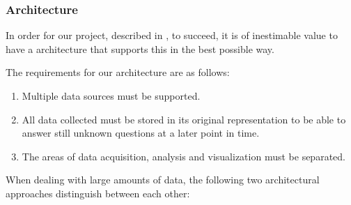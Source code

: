 \subsubsection{Architecture}
\label{subsubsec:architecture}
In order for our project, described in , to succeed, it is of inestimable value to have a
architecture that supports this in the best possible way.

The requirements for our architecture are as follows:
\begin{enumerate}
  \item Multiple data sources must be supported.
  \item All data collected must be stored in its original representation to be able to answer still unknown questions at a later point in time.
  \item The areas of data acquisition, analysis and visualization must be separated.
\end{enumerate}

When dealing with large amounts of data, the following two architectural approaches distinguish between each other:

